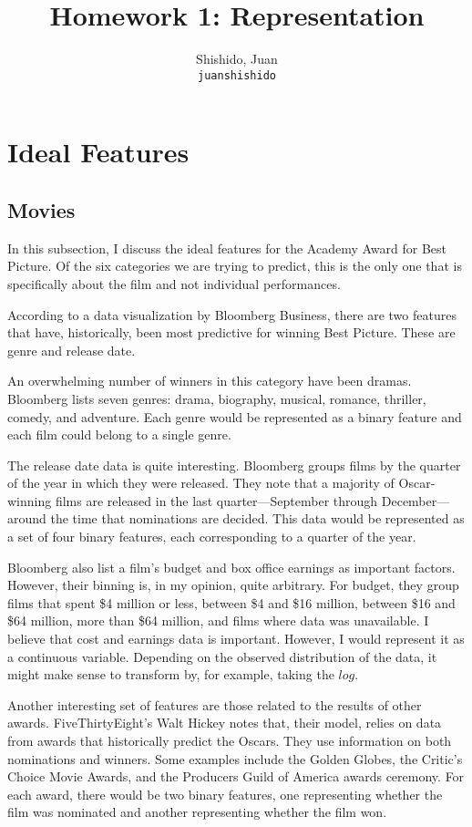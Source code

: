 \documentclass[11pt]{article}
\title{Homework 1: Representation}
\author{
  Shishido, Juan\\
  \texttt{juanshishido}
}
\begin{document}
\maketitle

\section{Ideal Features}

\subsection{Movies}

In this subsection, I discuss the ideal features for the Academy Award for Best 
Picture. Of the six categories we are trying to predict, this is the only one
that is specifically about the film and not individual performances.

According to a data visualization by Bloomberg Business\cite{bloomberg}, there
are two features that have, historically, been most predictive for winning
Best Picture. These are genre and release date.

An overwhelming number of winners in this category have been dramas. Bloomberg
lists seven genres: drama, biography, musical, romance, thriller, comedy, and
adventure. Each genre would be represented as a binary feature and each film
could belong to a single genre.

The release date data is quite interesting. Bloomberg groups films by the
quarter of the year in which they were released. They note that a majority of
Oscar-winning films are released in the last quarter---September through
December---around the time that nominations are decided. This data would be
represented as a set of four binary features, each corresponding to a quarter
of the year.

Bloomberg also list a film's budget and box office earnings as important
factors. However, their binning is, in my opinion, quite arbitrary. For budget,
they group films that spent \$4 million or less, between \$4 and \$16 million, 
between \$16 and \$64 million, more than \$64 million, and films where data was
unavailable. I believe that cost and earnings data is important. However, I
would represent it as a continuous variable. Depending on the observed
distribution of the data, it might make sense to transform by, for example,
taking the $log$.

Another interesting set of features are those related to the results of other
awards. FiveThirtyEight's Walt Hickey notes that, their model, relies on data
from awards that historically predict the Oscars\cite{fivethirtyeight}. They
use information on both nominations and winners. Some examples include the
Golden Globes, the Critic's Choice Movie Awards, and the Producers Guild of
America awards ceremony. For each award, there would be two binary features,
one representing whether the film was nominated and another representing
whether the film won.
\end{document}
